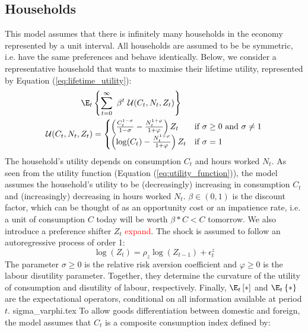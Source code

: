 \subsection{Households}
This model assumes that there is infinitely many households in the economy represented by a unit interval. All households are assumed to be be symmetric, i.e. have the same preferences and behave identically. Below, we consider a representative household that wants to maximise their lifetime utility, represented by Equation (\ref{eq:lifetime_utility}):
\begin{align}
    \E_t &\left\{\sum^{\infty}_{t=0} \ \beta^t \ \mathcal{U}(C_t, N_t, Z_t)\right\} \label{eq:lifetime_utility}\\
    \mathcal{U}(C_t, N_t, Z_t) &= 
    \begin{cases}
        \left( \frac{C_t^{1-\sigma}}{1-\sigma} - \frac{N_t^{1+\varphi}}{1+\varphi} \right)Z_t & \text{if $\sigma \geq 0$ and $\sigma \ne 1$}\\
        \left( \log(C_t) - \frac{N_t^{1+\varphi}}{1+\varphi} \right)Z_t & \text{if $\sigma = 1$}
    \end{cases}
    \label{eq:utility_function}
\end{align}
The household's utility depends on consumption $C_t$ and hours worked $N_t$. As seen from the utility function (Equation (\ref{eq:utility_function})), the model assumes the household's utility to be (decreasingly) increasing in consumption $C_t$ and (increasingly) decreasing in hours worked $N_t$. $\beta \in (0,1)$ is the discount factor, which can be thought of as an opportunity cost or an impatience rate, i.e. a unit of consumption $C$ today will be worth $\beta * C < C$ tomorrow. We also introduce a preference shifter $Z_t$ \parencite[225]{jordigal_2015_monetary} \textcolor{red}{expand}. The shock is assumed to follow an autoregressive process of order 1:
\begin{equation}
    \log (Z_t) = \rho_z \log (Z_{t-1}) + \epsilon^z_{t}
\end{equation}
The parameter $\sigma \geq 0$ is the relative risk aversion coefficient and $\varphi \geq 0$ is the labour disutility parameter. Together, they determine the curvature of the utility of consumption and disutility of labour, respectively. Finally, $\E_t\left[*\right]$ and $\E_t\left\{*\right\}$ are the expectational operators, conditional on all information available at period $t$.
{sigma_varphi.tex}
To allow goods differentiation between domestic and foreign, the model assumes that $C_t$ is a composite consumption index defined by:

